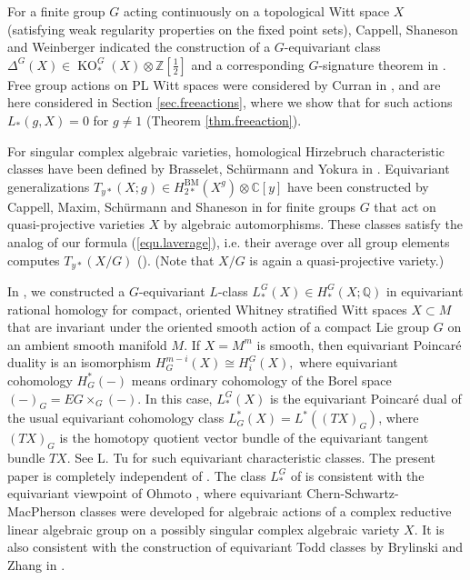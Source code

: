\documentclass{amsart}
\theoremstyle{definition}
\theoremstyle{remark}
\newcommand {\intg}  {\ensuremath{\mathbb{Z}}}
\newcommand {\cplx}  {\ensuremath{\mathbb{C}}}
\newcommand {\rat}   {\ensuremath{\mathbb{Q}}}
\newcommand {\smlhf} {\ensuremath{\mbox{$\frac{1}{2}$}}}
\newcommand {\KO}   {{\ensuremath{\operatorname{KO}}}}
\newcommand {\BM}    {{\ensuremath{\operatorname{BM}}}}
\begin{document}
For a finite group $G$ acting continuously on a topological Witt space $X$
(satisfying weak regularity properties on the fixed point sets),
Cappell, Shaneson and Weinberger indicated the construction of a $G$-equivariant
class 
$\Delta^G (X) \in \KO^G_* (X) \otimes \intg [\smlhf]$ 
and a corresponding $G$-signature theorem in \cite{csw}.
Free group actions on PL Witt spaces were considered by Curran in \cite{curran},
and are here considered in Section \ref{sec.freeactions},
where we show that for such actions $L_* (g,X) =0$
for $g\not= 1$ (Theorem \ref{thm.freeaction}).

For singular complex algebraic varieties, homological Hirzebruch characteristic
classes have been defined by
Brasselet, Sch\"urmann and Yokura in \cite{bsy}.
Equivariant generalizations
$T_{y*} (X;g) \in H^\BM_{2*} (X^g) \otimes \cplx [y]$
have been constructed  
by Cappell, Maxim, Sch\"urmann and Shaneson in \cite{cmssequivcharcl}
for finite groups $G$
that act on quasi-projective varieties $X$ by algebraic automorphisms.
These classes satisfy the analog of our formula (\ref{equ.laverage}), i.e. their average
over all group elements computes $T_{y*} (X/G)$
(\cite[p. 1726, Thm. 1.1]{cmssequivcharcl}).
(Note that $X/G$ is again a quasi-projective variety.)

In \cite{banaglborelequivlclass},
we constructed a $G$-equivariant $L$-class
$L^G_* (X) \in H^G_* (X;\rat)$ in equivariant rational homology for
compact, oriented Whitney stratified Witt spaces $X \subset M$ that are
invariant under the oriented smooth action of a compact Lie group
$G$ on an ambient smooth manifold $M$. 
If $X=M^m$ is smooth, then equivariant Poincar\'e duality is an
isomorphism $H^{m-i}_G (X) \cong H^G_i (X),$ where
equivariant cohomology $H^*_G (-)$
means ordinary cohomology of the Borel space $(-)_G = EG\times_G (-)$.
In this case, $L^G_* (X)$ is the equivariant Poincar\'e dual
of the usual equivariant cohomology class $L^*_G (X) = L^* ((TX)_G)$,
where $(TX)_G$ is the homotopy quotient vector bundle of the equivariant tangent 
bundle $TX$. See L. Tu \cite[Chapter 30.3]{tuintrolectequivcoh} for such equivariant
characteristic classes.
The present paper is completely independent of \cite{banaglborelequivlclass}.
The class $L^G_*$ of \cite{banaglborelequivlclass}
is consistent with the equivariant viewpoint
of Ohmoto \cite{ohmoto1}, where equivariant Chern-Schwartz-MacPherson classes
were developed for algebraic actions of a complex reductive linear algebraic group 
on a possibly singular complex algebraic variety $X$.
It is also consistent with the construction of equivariant Todd classes by
Brylinski and Zhang in \cite{brylinskizhang}.\\
\end{document}
